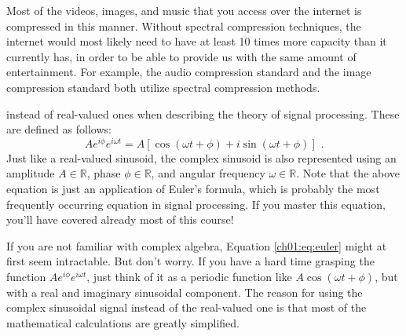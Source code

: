 Most of the videos, images, and music that you access over the
internet is compressed in this manner. Without spectral compression
techniques, the internet would most likely need to have at least 10
times more capacity than it currently has, in order to be able to
provide us with the same amount of entertainment. For example,
the  audio compression standard and
the  image compression standard both utilize spectral
compression methods.


 instead of real-valued ones when describing the theory of signal
processing. These are defined as follows:
\begin{equation}
A e^{i\phi }e^{i\omega t} = A[\cos(\omega t+\phi) + i\sin(\omega
t+\phi)] \,\,.
\label{ch01:eq:euler}
\end{equation}
Just like a real-valued sinusoid, the complex sinusoid is also
represented using an amplitude $A \in \mathbb{R}$, phase
$\phi \in \mathbb{R}$, and angular frequency $\omega \in \mathbb{R}$. Note
that the above equation is just an application of Euler's
formula, which is probably the most frequently occurring
equation in signal processing. If you master this equation, you'll
have covered already most of this course!

If you are not familiar with complex algebra,
Equation \ref{ch01:eq:euler} might at first seem intractable. But
don't worry. If you have a hard time grasping the function $A e^{i\phi
}e^{i\omega t}$, just think of it as a periodic function like
$A\cos(\omega t + \phi)$, but with a real and imaginary sinusoidal
component. The reason for using the complex sinusoidal signal instead
of the real-valued one is that most of the mathematical calculations
are greatly simplified.

